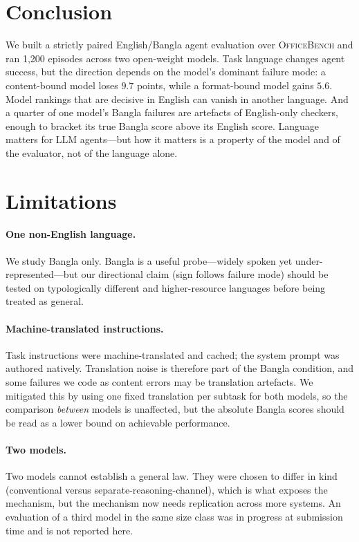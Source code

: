 \documentclass[11pt]{article}
\begin{document}
\section{Conclusion}

We built a strictly paired English/Bangla agent evaluation over \textsc{OfficeBench} and ran
1{,}200 episodes across two open-weight models. Task language changes agent success, but the
direction depends on the model's dominant failure mode: a content-bound model loses $9.7$
points, while a format-bound model gains $5.6$. Model rankings that are decisive in English can
vanish in another language. And a quarter of one model's Bangla failures are artefacts of
English-only checkers, enough to bracket its true Bangla score above its English score. Language
matters for LLM agents---but how it matters is a property of the model and of the evaluator, not
of the language alone.

\section*{Limitations}

\paragraph{One non-English language.} We study Bangla only. Bangla is a useful probe---widely
spoken yet under-represented---but our directional claim (sign follows failure mode) should be
tested on typologically different and higher-resource languages before being treated as general.

\paragraph{Machine-translated instructions.} Task instructions were machine-translated and
cached; the system prompt was authored natively. Translation noise is therefore part of the
Bangla condition, and some failures we code as content errors may be translation artefacts. We
mitigated this by using one fixed translation per subtask for both models, so the comparison
\emph{between} models is unaffected, but the absolute Bangla scores should be read as a lower
bound on achievable performance.

\paragraph{Two models.} Two models cannot establish a general law. They were chosen to differ in
kind (conventional versus separate-reasoning-channel), which is what exposes the mechanism, but
the mechanism now needs replication across more systems. An evaluation of a third model in the
same size class was in progress at submission time and is not reported here.
\end{document}

